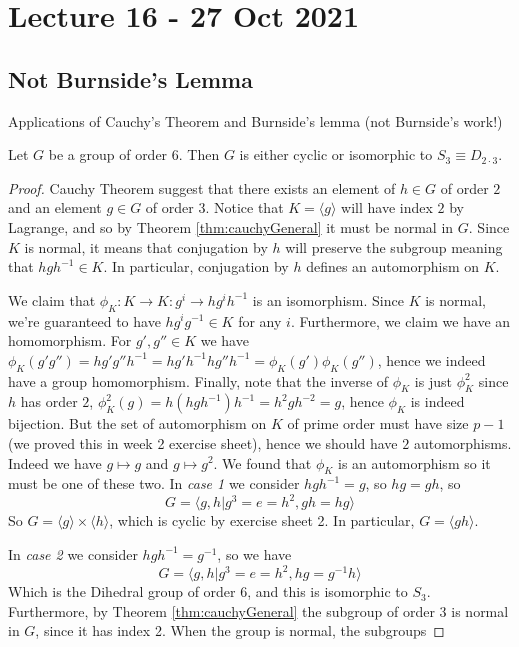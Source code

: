 \section{Lecture 16 - 27 Oct 2021}
\subsection{Not Burnside's Lemma}
Applications of Cauchy's Theorem and Burnside's lemma (not Burnside's work!)
\begin{example} 
  Let $G$ be a group of order $6$. Then $G$ is either cyclic or isomorphic to $S_3\equiv
  D_{2\cdot 3}$.
\end{example}
\begin{proof}
  Cauchy Theorem suggest that there exists an element of $h\in G$ of order $2$ and an
  element $g\in G$ of order $3$. Notice that $K=\langle g \rangle$ will have index $2$ by
  Lagrange, and so by Theorem \ref{thm:cauchyGeneral} it must be normal in $G$. Since $K$
  is normal, it means that conjugation by $h$ will preserve the subgroup meaning that
  $hgh^{-1}\in K$. In particular, conjugation by $h$ defines an automorphism on $K$. 

  We claim that $\phi_K:K\to K: g^i\to hg^ih^{-1}$ is an isomorphism. Since $K$ is normal,
  we're guaranteed to have $hg^ig^{-1}\in K$ for any $i$. Furthermore, we claim we have an
  homomorphism. For $g',g''\in K$ we have $\phi_K(g'g'')=hg'g''h^{-1}=
  hg'h^{-1}hg''h^{-1}=\phi_K(g')\phi_K(g'')$, hence we indeed have a group homomorphism.
  Finally, note that the inverse of $\phi_K$ is just $\phi_K^2$ since $h$ has order $2$,
  $\phi_K^2(g)=h(hgh^{-1})h^{-1}= h^2 g h^{-2} = g$, hence $\phi_K$ is indeed bijection. But
  the set of automorphism on $K$ of prime order must have size $p-1$ (we proved this in week
  2 exercise sheet), hence we should have $2$ automorphisms. Indeed we have $g\mapsto g$ and
  $g\mapsto g^2$. We found that $\phi_K$ is an automorphism so it must be one of these two.
  In \emph{case 1} we consider $hgh^{-1}=g$, so $hg=gh$, so 
  \[G=\langle g,h | g^3=e=h^2, gh=hg \rangle\]
  So $G=\langle g \rangle \times \langle h \rangle$, which is cyclic by exercise sheet 2.
  In particular, $G=\langle gh \rangle$.

  In \emph{case 2} we consider $hgh^{-1}=g^{-1}$, so we have
  \[G=\langle g,h | g^3=e=h^2, hg=g^{-1}h\rangle\]
  Which is the Dihedral group of order $6$, and this is isomorphic to $S_3$. Furthermore,
  by Theorem \ref{thm:cauchyGeneral} the subgroup of order $3$ is normal in $G$, since it
  has index 2. When the group is normal, the subgroups 
\end{proof}



